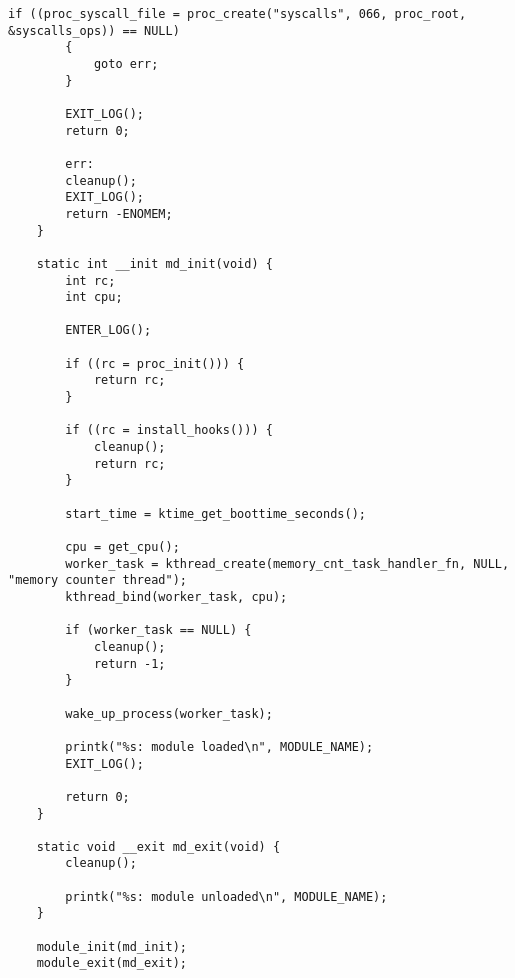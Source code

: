 \begin{lstlisting}[caption={листинг файла monitor\_main.c}]
		if ((proc_syscall_file = proc_create("syscalls", 066, proc_root, &syscalls_ops)) == NULL)
		{
			goto err;
		}
		
		EXIT_LOG();
		return 0;
		
		err:
		cleanup();
		EXIT_LOG();
		return -ENOMEM;
	}
	
	static int __init md_init(void) {
		int rc;
		int cpu;
		
		ENTER_LOG();
		
		if ((rc = proc_init())) {
			return rc;
		}
		
		if ((rc = install_hooks())) {
			cleanup();
			return rc;
		}
		
		start_time = ktime_get_boottime_seconds();
		
		cpu = get_cpu();
		worker_task = kthread_create(memory_cnt_task_handler_fn, NULL, "memory counter thread");
		kthread_bind(worker_task, cpu);
		
		if (worker_task == NULL) {
			cleanup();
			return -1;
		}
		
		wake_up_process(worker_task);
		
		printk("%s: module loaded\n", MODULE_NAME);
		EXIT_LOG();
		
		return 0;
	}
	
	static void __exit md_exit(void) { 
		cleanup();
		
		printk("%s: module unloaded\n", MODULE_NAME); 
	}
	
	module_init(md_init);
	module_exit(md_exit);
\end{lstlisting}

